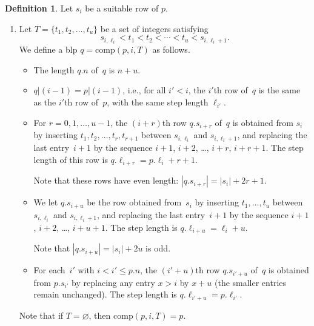 \documentclass{article}
\theoremstyle{definition}
\newtheorem{definition}[lemma]{Definition}
\theoremstyle{remark}
\begin{document}
\begin{definition} \label{def:full_comp}
    Let $s_i$ be a suitable row of $p$. 
    
    \begin{enumerate}
    \item  Let $T = \{t_1, t_2, \dots, t_u\}$ be a set of integers satisfying 
    \[
     s_{i,\ell_i} < t_1 < t_2 < \cdots < t_u < s_{i,\ell_i+1}. 
    \]
    We define a blp $q=\mathrm{comp}(p, i, T)$ as follows. 
    \begin{itemize}
      \item The length $q.n$ of~$q$ is $n+u$. 

      \item $q | (i-1) = p|(i-1)$, i.e., for all $i'<i$, the $i'$th row of~$q$ is the same as the $i'$th row of~$p$, with the same step length $\ell_{i'}$. 

      \item For $r=0,1,\dots, u-1$, the $(i+r)$th row $q.s_{i+r}$ of~$q$ is obtained from $s_i$ by inserting $t_1,t_2,\dots, t_r, t_{r+1}$ between $s_{i,\ell_i}$ and $s_{i,\ell_i+1}$, and replacing the last entry~$i+1$ by the sequence $i+1$, $i+2$, \dots, $i+r$, $i+r+1$.  The step length of this row is $q.\ell_{i+r} = p.\ell_i+ r+1$.

      Note that these rows have even length: $|q.s_{i+r}| = |s_i| + 2r+1$. 

      \item We let $q.s_{i+u}$ be the row obtained from~$s_i$ by inserting $t_1,\dots, t_u$ between $s_{i,\ell_i}$ and $s_{i,\ell_i+1}$, and replacing the last entry~$i+1$ by the sequence $i+1$, $i+2$, \dots, $i+u+1$. The step length is $q.\ell_{i+u} = \ell_i+u$. 

      Note that $|q.s_{i+u}| = |s_i|+2u$ is odd. 

      \item For each~$i'$ with $i<i'\le p.n$, the $(i'+u)$th row $q.s_{i'+u}$ of~$q$ is obtained from $p.s_{i'}$ by replacing any entry $x>i$  by $x+u$ (the smaller entries remain unchanged). The step length is $q.\ell_{i'+u} = p.\ell_{i'}$. 
    \end{itemize}

    Note that if $T = \varnothing$, then $\mathrm{comp}(p, i, T) = p$.



\end{enumerate}
\end{definition}
\end{document}
